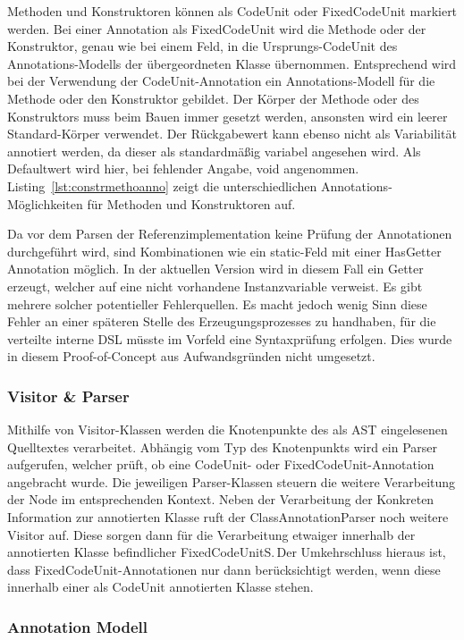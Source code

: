 \documentclass[12pt,oneside,a4paper,parskip]{scrbook}
\begin{document}
Methoden und Konstruktoren können als CodeUnit oder FixedCodeUnit markiert werden. Bei einer Annotation als FixedCodeUnit wird die Methode oder der Konstruktor, genau wie bei einem Feld, in die Ursprungs-CodeUnit des Annotations-Modells der übergeordneten Klasse übernommen. Entsprechend wird bei der Verwendung der CodeUnit-Annotation ein Annotations-Modell für die Methode oder den Konstruktor gebildet. Der Körper der Methode oder des Konstruktors muss beim Bauen immer gesetzt werden, ansonsten wird ein leerer Standard-Körper verwendet. Der Rückgabewert kann ebenso nicht als Variabilität annotiert werden, da dieser als standardmäßig variabel angesehen wird. Als Defaultwert wird hier, bei fehlender Angabe, void angenommen. Listing~\ref{lst:constrmethoanno} zeigt die unterschiedlichen Annotations-Möglichkeiten für Methoden und Konstruktoren auf.

Da vor dem Parsen der Referenzimplementation keine Prüfung der Annotationen durchgeführt wird, sind Kombinationen wie ein static-Feld mit einer HasGetter Annotation möglich. In der aktuellen Version wird in diesem Fall ein Getter erzeugt, welcher auf eine nicht vorhandene Instanzvariable verweist. Es gibt mehrere solcher potentieller Fehlerquellen. Es macht jedoch wenig Sinn diese Fehler an einer späteren Stelle des Erzeugungsprozesses zu handhaben, für die verteilte interne DSL müsste im Vorfeld eine Syntaxprüfung erfolgen. Dies wurde in diesem Proof-of-Concept aus Aufwandsgründen nicht umgesetzt.

\subsubsection{Visitor \& Parser}

Mithilfe von Visitor-Klassen werden die Knotenpunkte des als AST eingelesenen Quelltextes verarbeitet. Abhängig vom Typ des Knotenpunkts wird ein Parser aufgerufen, welcher prüft, ob eine CodeUnit- oder FixedCodeUnit-Annotation angebracht wurde. Die jeweiligen Parser-Klassen steuern die weitere Verarbeitung der Node im entsprechenden Kontext. Neben der Verarbeitung der Konkreten Information zur annotierten Klasse ruft der ClassAnnotationParser noch weitere Visitor auf. Diese sorgen dann für die Verarbeitung etwaiger innerhalb der annotierten Klasse befindlicher FixedCodeUnitS.\,Der Umkehrschluss hieraus ist, dass FixedCodeUnit-Annotationen nur dann berücksichtigt werden, wenn diese innerhalb einer als CodeUnit annotierten Klasse stehen.

\subsubsection{Annotation Modell}
\end{document}

